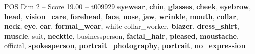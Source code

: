 \begin{textsample}{POS Dim 2 – Score 19.00 – t009929}  \label{ex:f2_pos_039}
\textbf{eyewear}, \textbf{chin}, \textbf{glasses}, \textbf{cheek}, \textbf{eyebrow}, \textbf{head}, \textbf{vision\_care}, \textbf{forehead}, \textbf{face}, \textbf{nose}, \textbf{jaw}, \textbf{wrinkle}, \textbf{mouth}, \textbf{collar}, \textbf{neck}, \textbf{eye}, \textbf{ear}, \textbf{formal\_wear}, white-collar\_worker, \textbf{blazer}, \textbf{dress\_shirt}, \textbf{muscle}, suit, \textbf{necktie}, businessperson, \textbf{facial\_hair}, \textbf{pleased}, \textbf{moustache}, official, \textbf{spokesperson}, \textbf{portrait\_photography}, \textbf{portrait}, \textbf{no\_expression}

\end{textsample}
